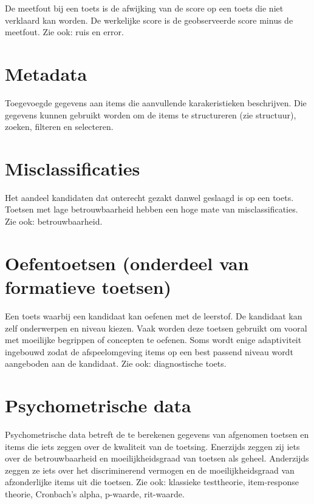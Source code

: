 \documentclass[
  letterpaper,
  DIV=11,
  numbers=noendperiod]{scrreprt}
\begin{document}
De meetfout bij een toets is de afwijking van de score op een toets die
niet verklaard kan worden. De werkelijke score is de geobserveerde score
minus de meetfout. Zie ook: ruis en error.

\hypertarget{metadata}{%
\section{Metadata}\label{metadata}}

Toegevoegde gegevens aan items die aanvullende karakeristieken
beschrijven. Die gegevens kunnen gebruikt worden om de items te
structureren (zie structuur), zoeken, filteren en selecteren.

\hypertarget{misclassificaties}{%
\section{Misclassificaties}\label{misclassificaties}}

Het aandeel kandidaten dat onterecht gezakt danwel geslaagd is op een
toets. Toetsen met lage betrouwbaarheid hebben een hoge mate van
misclassificaties. Zie ook: betrouwbaarheid.

\hypertarget{oefentoetsen-onderdeel-van-formatieve-toetsen}{%
\section{Oefentoetsen (onderdeel van formatieve
toetsen)}\label{oefentoetsen-onderdeel-van-formatieve-toetsen}}

Een toets waarbij een kandidaat kan oefenen met de leerstof. De
kandidaat kan zelf onderwerpen en niveau kiezen. Vaak worden deze
toetsen gebruikt om vooral met moeilijke begrippen of concepten te
oefenen. Soms wordt enige adaptiviteit ingebouwd zodat de
afspeelomgeving items op een best passend niveau wordt aangeboden aan de
kandidaat. Zie ook: diagnostische toets.

\hypertarget{psychometrische-data}{%
\section{Psychometrische data}\label{psychometrische-data}}

Psychometrische data betreft de te berekenen gegevens van afgenomen
toetsen en items die iets zeggen over de kwaliteit van de toetsing.
Enerzijds zeggen zij iets over de betrouwbaarheid en moeilijkheidsgraad
van toetsen als geheel. Anderzijds zeggen ze iets over het
discriminerend vermogen en de moeilijkheidsgraad van afzonderlijke items
uit die toetsen. Zie ook: klassieke testtheorie, item-response theorie,
Cronbach's alpha, p-waarde, rit-waarde.
\end{document}
